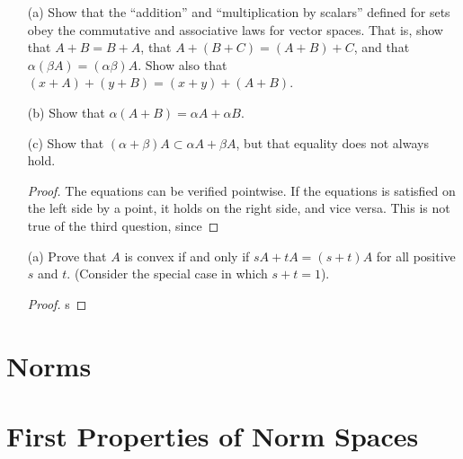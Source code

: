 \begin{exercise}
    \begin{enumerate}
        \item[(a)] Show that the ``addition'' and ``multiplication by scalars'' defined for sets obey the commutative and associative laws for vector spaces. That is, show that $A + B = B + A$, that $A + (B + C) = (A + B) + C$, and that $\alpha (\beta A) = (\alpha \beta) A$. Show also that $(x + A) + (y + B) = (x + y) + (A + B)$.
        \item[(b)] Show that $\alpha(A + B) = \alpha A + \alpha B$.
        \item[(c)] Show that $(\alpha + \beta)A \subset \alpha A + \beta A$, but that equality does not always hold.
        \begin{proof}
            The equations can be verified pointwise. If the equations is satisfied on the left side by a point, it holds on the right side, and vice versa. This is not true of the third question, since 
        \end{proof}
    \end{enumerate}
\end{exercise}

\begin{exercise}
    \begin{enumerate}
        \item[(a)] Prove that $A$ is convex if and only if $sA + tA = (s + t)A$ for all positive $s$ and $t$. (Consider the special case in which $s + t = 1$).
        \begin{proof}
            s
        \end{proof}
    \end{enumerate}
\end{exercise}

\section{Norms}

\section{First Properties of Norm Spaces}

